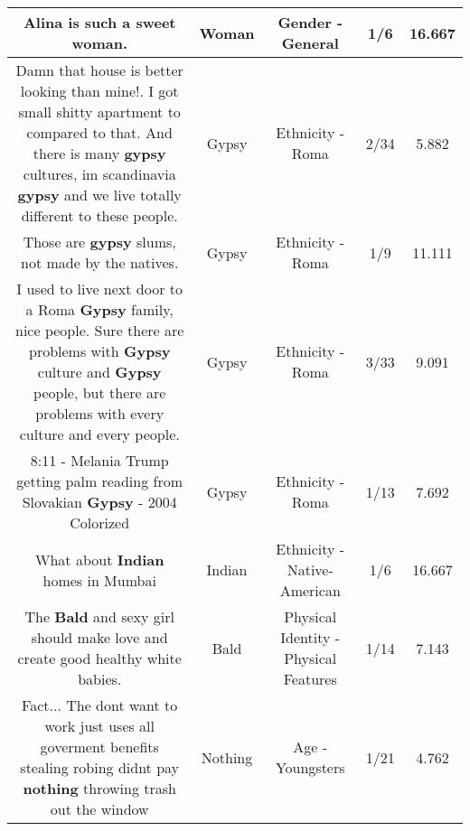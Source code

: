 \documentclass[11pt]{article}
\newlength\mylength
\begin{document}
\begin{center}
\begin{longtable}{|C{.65\mylength}|C{.30\mylength}|C{.12\mylength}|C{.12\mylength}|C{.12\mylength}|}
  \small Alina is such a sweet \textbf{woman}.\normalsize   & Woman & Gender - General & 1/6 & 16.667 \\  \hline
  \small Damn that house is better looking than mine!. I got small shitty apartment to compared to that. And there is many \textbf{gypsy} cultures, im scandinavia \textbf{gypsy} and we live totally different to these people.\normalsize   & Gypsy & Ethnicity - Roma & 2/34 & 5.882 \\  \hline
  \small Those are \textbf{gypsy} slums, not made by the natives.\normalsize   & Gypsy & Ethnicity - Roma & 1/9 & 11.111 \\  \hline
  \small I used to live next door to a Roma \textbf{Gypsy} family, nice people. Sure there are problems with \textbf{Gypsy} culture and \textbf{Gypsy} people, but there are problems with every culture and every people.\normalsize   & Gypsy & Ethnicity - Roma & 3/33 & 9.091 \\  \hline
  \small 8:11 - Melania Trump getting palm reading from Slovakian \textbf{Gypsy} - 2004 Colorized\normalsize   & Gypsy & Ethnicity - Roma & 1/13 & 7.692 \\  \hline
  \small What about \textbf{Indian} homes in Mumbai\normalsize   & Indian & Ethnicity - Native-American & 1/6 & 16.667 \\  \hline
  \small The \textbf{Bald} and sexy girl should make love and create good healthy white babies.\normalsize   & Bald & Physical Identity - Physical Features & 1/14 & 7.143 \\  \hline
  \small Fact... The dont want to work just uses all goverment benefits stealing robing didnt pay \textbf{nothing} throwing trash out the window\normalsize   & Nothing & Age - Youngsters & 1/21 & 4.762 \\  \hline

\end{longtable}
\end{center}
\end{document}
